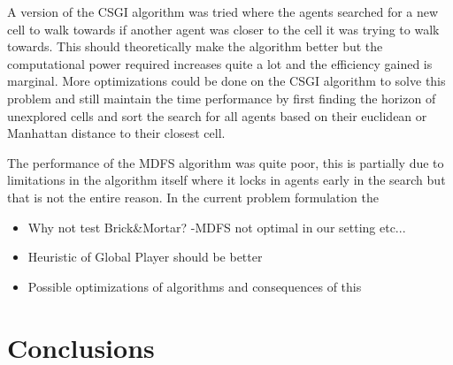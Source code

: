 \documentclass{article}
\begin{document}
A version of the CSGI algorithm was tried where the agents searched for a new cell to walk towards if another agent was closer to the cell it was trying to walk towards. This should theoretically make the algorithm better but the computational power required increases quite a lot and the efficiency gained is marginal. More optimizations could be done on the CSGI algorithm to solve this problem and still maintain the time performance by first finding the horizon of unexplored cells and sort the search for all agents based on their euclidean or Manhattan distance to their closest cell.

The performance of the MDFS algorithm was quite poor, this is partially due to
limitations in the algorithm itself where it locks in agents early in the
search but that is not the entire reason. In the current problem formulation the 

\begin{itemize}
    \item Why not test Brick\&Mortar? -MDFS not optimal in our setting etc...
    \item Heuristic of Global Player should be better
    \item Possible optimizations of algorithms and consequences of this
\end{itemize}

\section{Conclusions}




\end{document}
